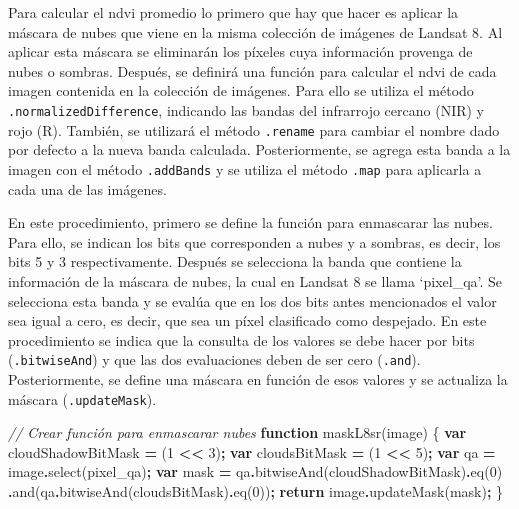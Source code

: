 \documentclass[
  12pt,
  letterpaper,
  twoside]{book}
\newenvironment{Shaded}{\begin{snugshade}}{\end{snugshade}}
\newcommand{\CommentTok}[1]{\textcolor[rgb]{0.56,0.35,0.01}{\textit{#1}}}
\newcommand{\ControlFlowTok}[1]{\textcolor[rgb]{0.13,0.29,0.53}{\textbf{#1}}}
\newcommand{\DecValTok}[1]{\textcolor[rgb]{0.00,0.00,0.81}{#1}}
\newcommand{\FunctionTok}[1]{\textcolor[rgb]{0.00,0.00,0.00}{#1}}
\newcommand{\KeywordTok}[1]{\textcolor[rgb]{0.13,0.29,0.53}{\textbf{#1}}}
\newcommand{\NormalTok}[1]{#1}
\newcommand{\OperatorTok}[1]{\textcolor[rgb]{0.81,0.36,0.00}{\textbf{#1}}}
\newcommand{\StringTok}[1]{\textcolor[rgb]{0.31,0.60,0.02}{#1}}
\begin{document}
Para calcular el ndvi promedio lo primero que hay que hacer es aplicar la máscara de nubes que viene en la misma colección de imágenes de Landsat 8. Al aplicar esta máscara se eliminarán los píxeles cuya información provenga de nubes o sombras. Después, se definirá una función para calcular el ndvi de cada imagen contenida en la colección de imágenes. Para ello se utiliza el método \texttt{.normalizedDifference}, indicando las bandas del infrarrojo cercano (NIR) y rojo (R). También, se utilizará el método \texttt{.rename} para cambiar el nombre dado por defecto a la nueva banda calculada. Posteriormente, se agrega esta banda a la imagen con el método \texttt{.addBands} y se utiliza el método \texttt{.map} para aplicarla a cada una de las imágenes.

En este procedimiento, primero se define la función para enmascarar las nubes. Para ello, se indican los bits que corresponden a nubes y a sombras, es decir, los bits 5 y 3 respectivamente. Después se selecciona la banda que contiene la información de la máscara de nubes, la cual en Landsat 8 se llama `pixel\_qa'. Se selecciona esta banda y se evalúa que en los dos bits antes mencionados el valor sea igual a cero, es decir, que sea un píxel clasificado como despejado. En este procedimiento se indica que la consulta de los valores se debe hacer por bits (\texttt{.bitwiseAnd}) y que las dos evaluaciones deben de ser cero (\texttt{.and}). Posteriormente, se define una máscara en función de esos valores y se actualiza la máscara (\texttt{.updateMask}).

\begin{Shaded}
\begin{Highlighting}[]
\CommentTok{// Crear función para enmascarar nubes}
\KeywordTok{function} \FunctionTok{maskL8sr}\NormalTok{(image) \{}
  \KeywordTok{var}\NormalTok{ cloudShadowBitMask }\OperatorTok{=}\NormalTok{ (}\DecValTok{1} \OperatorTok{\textless{}\textless{}} \DecValTok{3}\NormalTok{)}\OperatorTok{;}
  \KeywordTok{var}\NormalTok{ cloudsBitMask }\OperatorTok{=}\NormalTok{ (}\DecValTok{1} \OperatorTok{\textless{}\textless{}} \DecValTok{5}\NormalTok{)}\OperatorTok{;}
  \KeywordTok{var}\NormalTok{ qa }\OperatorTok{=}\NormalTok{ image}\OperatorTok{.}\FunctionTok{select}\NormalTok{(}\StringTok{\textquotesingle{}pixel\_qa\textquotesingle{}}\NormalTok{)}\OperatorTok{;}
  \KeywordTok{var}\NormalTok{ mask }\OperatorTok{=}\NormalTok{ qa}\OperatorTok{.}\FunctionTok{bitwiseAnd}\NormalTok{(cloudShadowBitMask)}\OperatorTok{.}\FunctionTok{eq}\NormalTok{(}\DecValTok{0}\NormalTok{)}
                 \OperatorTok{.}\FunctionTok{and}\NormalTok{(qa}\OperatorTok{.}\FunctionTok{bitwiseAnd}\NormalTok{(cloudsBitMask)}\OperatorTok{.}\FunctionTok{eq}\NormalTok{(}\DecValTok{0}\NormalTok{))}\OperatorTok{;}
  \ControlFlowTok{return}\NormalTok{ image}\OperatorTok{.}\FunctionTok{updateMask}\NormalTok{(mask)}\OperatorTok{;}
\NormalTok{\}}
\end{Highlighting}
\end{Shaded}
\end{document}
